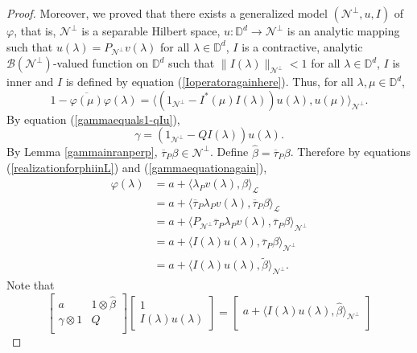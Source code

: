 \documentclass[11pt, reqno]{amsart}
\newcommand\1{\boldsymbol {1}}
\numberwithin{equation}{section}
\begin{document}
\begin{proof}
Moreover, we proved that there exists a generalized model $(\mathcal{N}^{\perp},u,I)$ of $\varphi$, that is, $\mathcal{N}^{\perp}$ is a separable Hilbert space, $u:\mathbb{D}^{d}\rightarrow \mathcal{N}^{\perp}$ is an analytic mapping such that $u(\lambda)=P_{\mathcal{N}^{\perp}}v(\lambda)$ for all $\lambda\in\mathbb{D}^{d}$, $I$ is a contractive, analytic $\mathcal{B}(\mathcal{N}^{\perp})$-valued function on $\mathbb{D}^{d}$ such that $\|I(\lambda)\|_{\mathcal{N}^{\perp}}<1$ for all $\lambda\in\mathbb{D}^{d}$, $I$ is inner and $I$ is defined by equation (\ref{Ioperatoragainhere}). Thus, for all $\lambda,\mu\in\mathbb{D}^{d}$,
$$1-\overline{\varphi(\mu)}\varphi(\lambda) = \langle( 1_{\mathcal{N}^{\perp}}-I^{*}(\mu)I(\lambda))u(\lambda),u(\mu)\rangle_{\mathcal{N}^{\perp}}.$$
By equation (\ref{gammaequals1-qIu}), 
\begin{equation}\label{gammaequationagain}
\gamma=(1_{\mathcal{N}^{\perp}}-QI(\lambda))u(\lambda).
\end{equation}
By Lemma \ref{gammainranperp}, $\overline{\tau}_{P}\beta\in\mathcal{N}^{\perp}$. Define ${\hat{\beta}}=\overline{\tau}_{P}\beta$. Therefore by equations (\ref{realizationforphiinL}) and (\ref{gammaequationagain}),
\begin{align*}
\varphi(\lambda)    &= a+\langle \lambda_{P} v(\lambda),\beta\rangle_{\mathcal{L}} \\
                    &= a+\langle \overline{\tau}_{P}\lambda_{P} v(\lambda),\overline{\tau}_{P}\beta\rangle_{\mathcal{L}} \\
                    &= a+\langle P_{\mathcal{N}^{\perp}}\overline{\tau}_{P}\lambda_{P} v(\lambda),\overline{\tau}_{P}\beta\rangle_{\mathcal{N}^{\perp}} \\ 
                    &= a+\langle I(\lambda)u(\lambda),\overline{\tau}_{P}\beta\rangle_{\mathcal{N}^{\perp}}\\
                    &= a+\langle I(\lambda)u(\lambda),{\tilde{\beta}}\rangle_{\mathcal{N}^{\perp}}.
\end{align*}
Note that
$$\begin{bmatrix}
    a & 1\otimes{\hat{\beta}} \\
    \gamma\otimes 1 & Q \\
\end{bmatrix}\begin{bmatrix}
    1 \\
    I(\lambda)u(\lambda)
\end{bmatrix} = \begin{bmatrix}
    a+\langle I(\lambda)u(\lambda),{\hat{\beta}}\rangle_{\mathcal{N}^{\perp}} \\

\end{bmatrix}$$
\end{proof}
\end{document}
